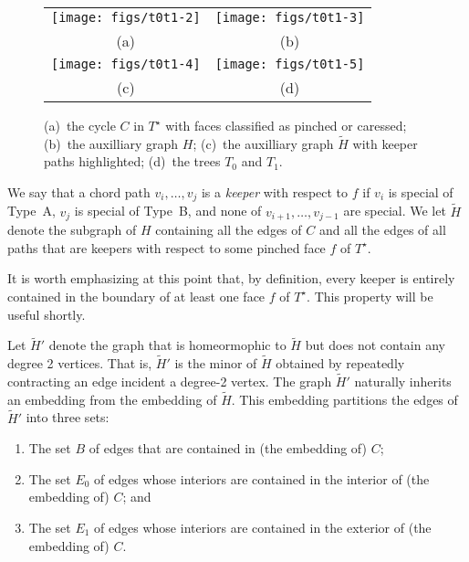 \documentclass[a4paper,UKenglish]{socg-lipics-v2019}
\newcommand{\dual}[1]{{#1}^\star}
\begin{document}
  \begin{figure}
     \begin{center}\begin{tabular}{cc}
		\texttt{[image: figs/t0t1-2]} &
		\texttt{[image: figs/t0t1-3]} \\
                (a) & (b) \\[1em]
		\texttt{[image: figs/t0t1-4]} & 
		\texttt{[image: figs/t0t1-5]} \\
                (c) & (d)
     \end{tabular}\end{center}
	  \caption{(a)~the cycle $C$ in $\dual{T}$ with faces classified as pinched or caressed; (b)~the auxilliary graph $H$; (c)~the auxilliary graph $\tilde{H}$ with keeper paths highlighted; (d)~the trees $T_0$ and $T_1$.}
  \end{figure}


We say that a chord path $v_i,\ldots,v_j$ is a \emph{keeper} with respect to
$f$ if $v_i$ is special of Type~A, $v_j$ is special of Type~B, and none
of $v_{i+1},\ldots,v_{j-1}$ are special.  We let $\tilde{H}$ denote the
subgraph of $H$ containing all the edges of $C$ and all the edges of
all paths that are keepers with respect to some pinched face $f$ of $\dual{T}$.

It is worth emphasizing at this point that, by definition, every keeper is
entirely contained in the boundary of at least one face $f$ of $\dual{T}$.
This property will be useful shortly.

Let $\tilde{H}'$ denote the graph that is homeormophic to $\tilde{H}$
but does not contain any degree 2 vertices.  That is, $\tilde{H}'$
is the minor of $\tilde{H}$ obtained by repeatedly contracting an edge
incident a degree-2 vertex.  The graph $\tilde{H}'$ naturally inherits an
embedding from the embedding of $\tilde{H}$.  This embedding partitions
the edges of $\tilde{H}'$ into three sets:
\begin{enumerate}
  \item The set $B$ of edges that are contained in (the embedding of) $C$;
  \item The set $E_0$ of edges whose interiors are contained in the
  interior of (the embedding of) $C$; and
  \item The set $E_1$ of edges whose interiors are contained in the
  exterior of (the embedding of) $C$.
\end{enumerate}
\end{document}
